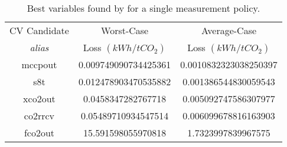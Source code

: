 \documentclass[../../msc-thesis.tex]{subfiles}
\begin{document}
\begin{table}[htb]
	\centering
	\caption{Best \soc variables found by \mtc for a single measurement policy.}	
	\begin{tabular}{c c c}
	\hline
	CV Candidate  & Worst-Case  & Average-Case  \\ 
    \textit{alias} 
	& Loss $(kWh/tCO_{2})$ & Loss $(kWh/tCO_{2})$ \\ \hline
	mccpout & \num{0.009749090734425361} & \num{0.0010832323038250397} \\
	s8t & \num{0.012478903470535882} & \num{0.001386544830059543} \\
	xco2out & \num{0.0458347282767718} & \num{0.005092747586307977} \\
	co2rrcv & \num{0.05489710934547514} & \num{0.006099678816163903} \\
	fco2out & \num{15.591598055970818} & \num{1.7323997839967575} \\ \hline
    \end{tabular}
    {
    }
	\label{tab:bestcvscpu1}
\end{table}
\end{document}
